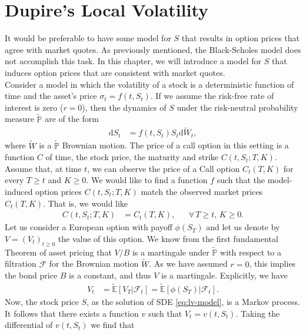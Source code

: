 \documentclass[12pt]{book}
\numberwithin{equation}{chapter}
\theoremstyle{plain}
\numberwithin{theorem}{section}
\theoremstyle{definition}
\numberwithin{exercise}{chapter}
\newcommand{\<}{\langle}
\renewcommand{\>}{\rangle}
\renewcommand{\(}{\left(}
\renewcommand{\)}{\right)}
\renewcommand{\[}{\left[}
\renewcommand{\]}{\right]}
\newcommand\Eb{\mathds{E}}
\newcommand\Pb{\mathds{P}}
\newcommand\Fc{\mathscr{F}}
\newcommand\sig{\sigma}
\newcommand\Ebt{\widetilde{\Eb}}
\newcommand\Pbt{\widetilde{\Pb}}
\newcommand\Wt{\widetilde{W}}
\newcommand\dd{\mathrm{d}}
\theoremstyle{definition}
\numberwithin{question}{section}
\begin{document}



\chapter{Dupire's Local Volatility}
It would be preferable to have some model for $S$ that results in option prices that agree with market quotes.  As previously mentioned, the Black-Scholes model does not accomplish this task.  In this chapter, we will introduce a model for $S$ that induces option prices that are consistent with market quotes.
\\[0.5em]
Consider a model in which the volatility of a stock is a deterministic function of time and the asset's price $\sig_t = f(t,S_t)$.  If we assume the risk-free rate of interest is zero ($r=0$), then the dynamics of $S$ under the risk-neutral probability measure $\Pbt$ are of the form
\begin{align}
\dd S_t 
	&= f(t,S_t) S_t \dd \Wt_t , \label{eq:lv-model}
\end{align}
where $\Wt$ is a $\Pbt$ Brownian motion.  The price of a call option in this setting is a function $C$ of time, the stock price, the maturity and strike $C(t,S_t;T,K)$.
Assume that, at time $t$, we can observe the price of a Call option $C_t(T,K)$ for every $T \geq t$ and $K \geq 0$.  We would like to find a function $f$ such that the model-induced option prices $C(t,S_t;T,K)$ match the observed market prices $C_t(T,K)$.  That is, we would like
\begin{align}
C(t,S_t;T,K)
	&=	C_t(T,K) , &
	&\forall \, T \geq t, \, K \geq 0 .
\end{align}
Let us consider a European option with payoff $\phi(S_T)$ and let us denote by $V = (V_t)_{t \geq 0}$ the value of this option.
We know from the first fundamental Theorem of asset pricing that $V/B$ is a martingale under $\Pbt$ with respect to a filtration $\Fc$ for the Brownian motion $\Wt$.
As we have assumed $r=0$, this implies the bond price $B$ is a constant, and thus $V$ is a martingale.  Explicitly, we have
\begin{align}
V_t
	&=	\Ebt [ V_T | \Fc_t ] =  \Ebt [ \phi(S_T) | \Fc_t ] .
\end{align}
Now, the stock price $S$, as the solution of SDE \eqref{eq:lv-model}, is a Markov process.  It follows that there exists a function $v$ such that $V_t = v(t,S_t)$.  Taking the differential of $v(t,S_t)$ we find that 
\end{document}
